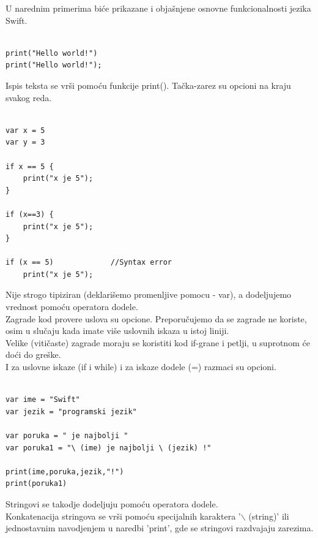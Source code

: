 \documentclass[a4paper]{article}
\begin{document}
U narednim primerima biće prikazane i objašnjene osnovne funkcionalnosti jezika Swift.

\begin{lstlisting}[caption={},frame=single, label=simple]

print("Hello world!")
print("Hello world!");

\end{lstlisting}

Ispis teksta se vrši pomoću funkcije print(). Tačka-zarez su opcioni na kraju svakog reda.\\



\begin{lstlisting}[caption={},frame=single, label=simple]

var x = 5
var y = 3

if x == 5 {
	print("x je 5");
}

if (x==3) {
	print("x je 5");
}

if (x == 5)				//Syntax error
	print("x je 5");

\end{lstlisting}

Nije strogo tipiziran (deklarišemo promenljive pomocu - var), a dodeljujemo vrednost pomoću operatora dodele.\\
Zagrade kod provere uslova su opcione. Preporučujemo da se zagrade ne koriste, osim u slučaju kada imate više uslovnih iskaza u istoj liniji.\\
Velike (vitičaste) zagrade moraju se koristiti kod if-grane i petlji, u suprotnom će doći do greške.\\
I za uslovne iskaze (if i while) i za iskaze dodele (=) razmaci su opcioni.\\



\begin{lstlisting}[caption={},frame=single, label=simple]

var ime = "Swift"
var jezik = "programski jezik"

var poruka = " je najbolji "
var poruka1 = "\ (ime) je najbolji \ (jezik) !" 

print(ime,poruka,jezik,"!")
print(poruka1)

\end{lstlisting}

Stringovi se takodje dodeljuju pomoću operatora dodele.\\
Konkatenacija stringova se vrši pomoću specijalnih karaktera '$\backslash$ (string)' ili jednostavnim navodjenjem u naredbi 'print', gde se stringovi razdvajaju zarezima.\\
\end{document}

